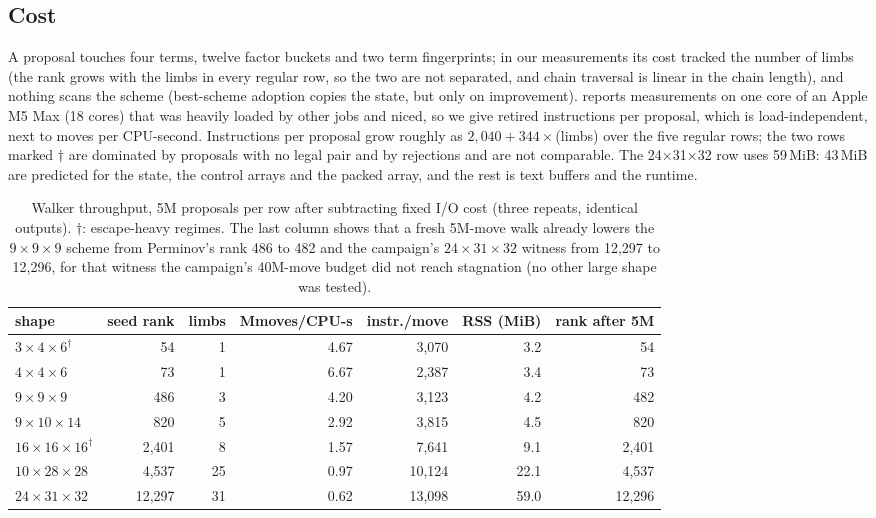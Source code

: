 \subsection{Cost}
A proposal touches four terms, twelve factor buckets and two term fingerprints; in our measurements its cost tracked the number of limbs (the rank grows with the limbs in every regular row, so the two are not separated, and chain traversal is linear in the chain length),
and nothing scans the scheme (best-scheme adoption copies the state, but only on improvement).  reports measurements on one core of an Apple M5 Max
(18 cores) that was heavily loaded by other jobs and niced, so we give retired instructions per proposal, which is load-independent, next to moves per CPU-second.
Instructions per proposal grow roughly as $2{,}040+344\times$(limbs) over the five regular rows; the two rows marked $\dagger$ are dominated by
proposals with no legal pair and by rejections and are not comparable. The 24$\times$31$\times$32 row uses 59\,MiB: 43\,MiB are predicted for the state, the control arrays and the packed array,
and the rest is text buffers and the runtime.

\begin{table}[t]
\centering\small
\begin{tabular}{@{}lrrrrrr@{}}
\toprule
shape & seed rank & limbs & Mmoves/CPU-s & instr./move & RSS (MiB) & rank after 5M\\
\midrule
$3\times4\times6^{\dagger}$ & 54 & 1 & 4.67 & 3{,}070 & 3.2 & 54\\
$4\times4\times6$ & 73 & 1 & 6.67 & 2{,}387 & 3.4 & 73\\
$9\times9\times9$ & 486 & 3 & 4.20 & 3{,}123 & 4.2 & 482\\
$9\times10\times14$ & 820 & 5 & 2.92 & 3{,}815 & 4.5 & 820\\
$16\times16\times16^{\dagger}$ & 2{,}401 & 8 & 1.57 & 7{,}641 & 9.1 & 2{,}401\\
$10\times28\times28$ & 4{,}537 & 25 & 0.97 & 10{,}124 & 22.1 & 4{,}537\\
$24\times31\times32$ & 12{,}297 & 31 & 0.62 & 13{,}098 & 59.0 & 12{,}296\\
\bottomrule
\end{tabular}
\caption{Walker throughput, 5M proposals per row after subtracting fixed I/O cost (three repeats, identical outputs). $\dagger$: escape-heavy regimes. The last column
shows that a fresh 5M-move walk already lowers the $9\times9\times9$ scheme from Perminov's rank 486 to 482 and the campaign's $24\times31\times32$ witness from 12{,}297 to 12{,}296,
for that witness the campaign's 40M-move budget did not reach stagnation (no other large shape was tested).}
\label{tab:throughput}
\end{table}

